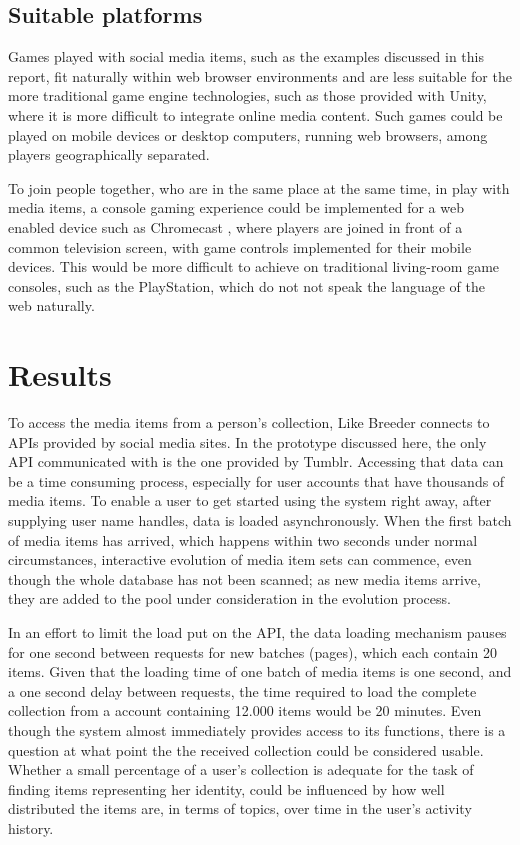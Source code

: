 \documentclass[conference]{IEEETran}
\begin{document}
\subsection{Suitable platforms}

Games played with social media items, such as the examples discussed in this report, fit naturally within web browser environments and are less suitable for the more traditional game engine technologies, such as those provided with Unity, where it is more difficult to integrate online media content.  Such games could be played on mobile devices or desktop computers, running web browsers, among players geographically separated.  

To join people together, who are in the same place at the same time, in play with media items, a console gaming experience could be implemented for a web enabled device such as Chromecast \cite{ChromecastGames}, where players are joined in front of a common television screen, with game controls implemented for their mobile devices.  This would be more difficult to achieve on traditional living-room game consoles, such as the PlayStation, which do not not speak the language of the web naturally.



\section{Results}
\label{sec:Results}

To access the media items from a person's collection, Like Breeder connects to APIs provided by social media sites.  In the prototype discussed here, the only API communicated with is the one provided by Tumblr.  Accessing that data can be a time consuming process, especially for user accounts that have thousands of media items.  To enable a user to get started using the system right away, after supplying user name handles, data is loaded asynchronously.  When the first batch of media items has arrived, which happens within two seconds under normal circumstances, interactive evolution of media item sets can commence, even though the whole database has not been scanned; as new media items arrive, they are added to the pool under consideration in the evolution process.  

In an effort to limit the load put on the API, the data loading mechanism pauses for one second between requests for new batches (pages), which each contain 20 items.  Given that the loading time of one batch of media items is one second, and a one second delay between requests, the time required to load the complete collection from a account containing 12.000 items would be 20 minutes.  Even though the system almost immediately provides access to its functions, there is a question at what point the the received collection could be considered usable.  Whether a small percentage of a user's collection is adequate for the task of finding items representing her identity, could be influenced by how well distributed the items are, in terms of topics, over time in the user's activity history.
	
\end{document}
